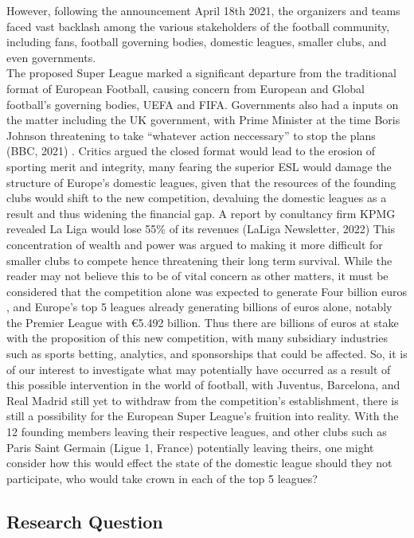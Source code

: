 \documentclass[
]{article}
\begin{document}
However, following the announcement April 18th 2021, the organizers and
teams faced vast backlash among the various stakeholders of the football
community, including fans, football governing bodies, domestic leagues,
smaller clubs, and even governments.\\
The proposed Super League marked a significant departure from the
traditional format of European Football, causing concern from European
and Global football's governing bodies, UEFA and FIFA. Governments also
had a inputs on the matter including the UK government, with Prime
Minister at the time Boris Johnson threatening to take ``whatever action
neccessary'' to stop the plans (BBC, 2021) . Critics argued the closed
format would lead to the erosion of sporting merit and integrity, many
fearing the superior ESL would damage the structure of Europe's domestic
leagues, given that the resources of the founding clubs would shift to
the new competition, devaluing the domestic leagues as a result and thus
widening the financial gap. A report by conultancy firm KPMG revealed La
Liga would lose 55\% of its revenues (LaLiga Newsletter, 2022) This
concentration of wealth and power was argued to making it more difficult
for smaller clubs to compete hence threatening their long term survival.
While the reader may not believe this to be of vital concern as other
matters, it must be considered that the competition alone was expected
to generate Four billion euros , and Europe's top 5 leagues already
generating billions of euros alone, notably the Premier League with
€5.492 billion. Thus there are billions of euros at stake with the
proposition of this new competition, with many subsidiary industries
such as sports betting, analytics, and sponsorships that could be
affected. So, it is of our interest to investigate what may potentially
have occurred as a result of this possible intervention in the world of
football, with Juventus, Barcelona, and Real Madrid still yet to
withdraw from the competition's establishment, there is still a
possibility for the European Super League's fruition into reality. With
the 12 founding members leaving their respective leagues, and other
clubs such as Paris Saint Germain (Ligue 1, France) potentially leaving
theirs, one might consider how this would effect the state of the
domestic league should they not participate, who would take crown in
each of the top 5 leagues?

\hypertarget{research-question}{%
\subsection{Research Question}\label{research-question}}
\end{document}
